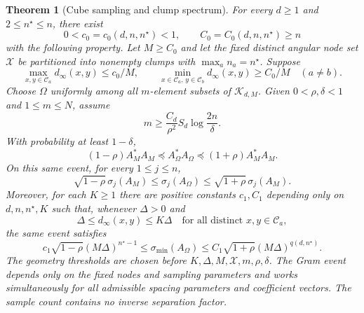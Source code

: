 \documentclass[11pt]{article}
\newtheorem{theorem}{Theorem}
\theoremstyle{definition}\newtheorem{definition}[theorem]{Definition}
\theoremstyle{remark}\newtheorem{remark}[theorem]{Remark}
\begin{document}
\begin{theorem}[Cube sampling and clump spectrum]
\label{thm:multidimensional-multi-clump-random-sampling}
For every $d\ge1$ and $2\le n^\star\le n$, there exist
\[
 0<c_0=c_0(d,n,n^\star)<1,\qquad C_0=C_0(d,n,n^\star)\ge n
\]
with the following property. Let $M\ge C_0$ and let the fixed distinct
angular node set $\mathcal X$ be partitioned into nonempty clumps with
$\max_a n_a=n^\star$. Suppose
\begin{equation}\label{eq:multidimensional-clump-geometry}
 \max_{x,y\in\mathcal C_a}d_\infty(x,y)\le c_0/M,\qquad
 \min_{x\in\mathcal C_a,\,y\in\mathcal C_b}d_\infty(x,y)\ge C_0/M\quad(a\ne b).
\end{equation}
Choose $\Omega$ uniformly among all $m$-element subsets of
$\mathcal K_{d,M}$. Given $0<\rho,\delta<1$ and $1\le m\le N$, assume
\begin{equation}\label{eq:multidimensional-sampling-rate}
 \boxed{m\ge\frac{C_d}{\rho^2}S_d\log\frac{2n}{\delta}.}
\end{equation}
With probability at least $1-\delta$,
\begin{equation}\label{eq:multidimensional-relative-gram}
 (1-\rho)A_M^*A_M\preceq A_\Omega^*A_\Omega
       \preceq(1+\rho)A_M^*A_M.
\end{equation}
On this same event, for every $1\le j\le n$,
\begin{equation}\label{eq:multidimensional-relative-spectrum}
 \sqrt{1-\rho}\,\sigma_j(A_M)\le\sigma_j(A_\Omega)
       \le\sqrt{1+\rho}\,\sigma_j(A_M).
\end{equation}
Moreover, for each $K\ge1$ there are positive constants $c_1,C_1$ depending
only on $d,n,n^\star,K$ such that, whenever $\Delta>0$ and
\begin{equation}\label{eq:multidimensional-comparable-spacing}
 \Delta\le d_\infty(x,y)\le K\Delta
       \quad\text{for all distinct }x,y\in\mathcal C_a,
\end{equation}
the same event satisfies
\begin{equation}\label{eq:multidimensional-sampled-smallest-singular-value}
 \boxed{c_1\sqrt{1-\rho}(M\Delta)^{n^\star-1}
       \le\sigma_{\min}(A_\Omega)
       \le C_1\sqrt{1+\rho}(M\Delta)^{q(d,n^\star)}.}
\end{equation}
The geometry thresholds are chosen before $K,\Delta,M,\mathcal X,m,\rho,\delta$.
The Gram event depends only on the fixed nodes and sampling parameters and
works simultaneously for all admissible spacing parameters and coefficient
vectors. The sample count contains no inverse separation factor.
\end{theorem}
\end{document}
